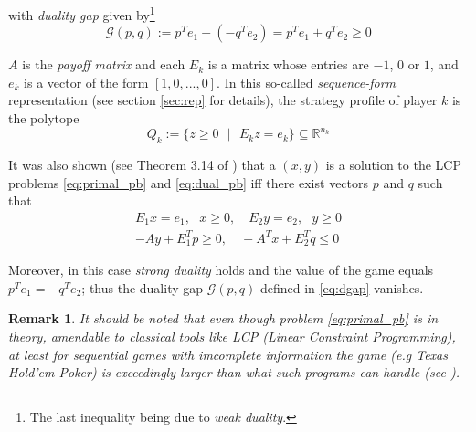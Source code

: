 \documentclass[12pt]{article}
\newtheorem{remark}{Remark}
\begin{document}
with \textit{duality gap} given by\footnote{The last inequality being due to \textit{weak duality}.}
\begin{equation}
  \mathcal{G}(p, q) := p^Te_1 - (-q^Te_2) = p^Te_1 + q^Te_2 \geq 0
  \label{eq:dgap}
\end{equation}

$A$ is the \textit{payoff matrix} and each $E_k$ is a matrix whose entries are $-1$, $0$ or $1$, and $e_k$ is a vector of the form $[1, 0, ..., 0]$. In this so-called \textit{sequence-form} representation (see section \ref{sec:rep} for details), the strategy profile of player $k$ is the polytope
\begin{equation}
  Q_k := \{z \ge 0\text{ }|\text{ }E_kz = e_k\} \subseteq \mathbb{R}^{n_k}
\label{eq:polytope}
\end{equation}

It was also shown (see Theorem 3.14 of \cite{vonequilibrium}) that a $(x, y)$ is a solution to the LCP problems \eqref{eq:primal_pb} and \eqref{eq:dual_pb} iff there exist vectors $p$ and $q$ such that
\begin{equation}
  \begin{split}
    E_1x = e_1,\text{ }x \geq 0,\hspace{1em} E_2y = e_2,\text{ }y \geq 0\\
    -Ay + E_1^Tp \geq 0,\hspace{1em}-A^Tx + E_2^Tq \leq 0
    \end{split}
\end{equation}

Moreover, in this case \textit{strong duality} holds and the value of the game equals $p^Te_1 = -q^Te_2$; thus the duality gap $\mathcal{G}(p, q)$ defined in \eqref{eq:dgap} vanishes.


\begin{remark}  
It should be noted that even though problem \eqref{eq:primal_pb} is in theory, amendable to classical tools like LCP (\textit{Linear Constraint Programming}), at least for sequential games with imcomplete information the game (e.g Texas Hold'em Poker) is exceedingly larger than what such programs can handle (see \cite{hoda2010smoothing}).
\end{remark}
\end{document}
